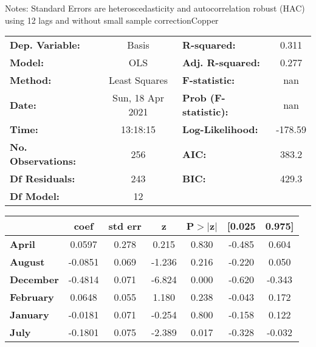 Notes: \newline
 [1] Standard Errors are heteroscedasticity and autocorrelation robust (HAC) using 12 lags and without small sample correctionCopper\begin{center}
\begin{tabular}{lclc}
\toprule
\textbf{Dep. Variable:}    &      Basis       & \textbf{  R-squared:         } &     0.311   \\
\textbf{Model:}            &       OLS        & \textbf{  Adj. R-squared:    } &     0.277   \\
\textbf{Method:}           &  Least Squares   & \textbf{  F-statistic:       } &       nan   \\
\textbf{Date:}             & Sun, 18 Apr 2021 & \textbf{  Prob (F-statistic):} &      nan    \\
\textbf{Time:}             &     13:18:15     & \textbf{  Log-Likelihood:    } &   -178.59   \\
\textbf{No. Observations:} &         256      & \textbf{  AIC:               } &     383.2   \\
\textbf{Df Residuals:}     &         243      & \textbf{  BIC:               } &     429.3   \\
\textbf{Df Model:}         &          12      & \textbf{                     } &             \\
\bottomrule
\end{tabular}
\begin{tabular}{lcccccc}
                   & \textbf{coef} & \textbf{std err} & \textbf{z} & \textbf{P$> |$z$|$} & \textbf{[0.025} & \textbf{0.975]}  \\
\midrule
\textbf{April}     &       0.0597  &        0.278     &     0.215  &         0.830        &       -0.485    &        0.604     \\
\textbf{August}    &      -0.0851  &        0.069     &    -1.236  &         0.216        &       -0.220    &        0.050     \\
\textbf{December}  &      -0.4814  &        0.071     &    -6.824  &         0.000        &       -0.620    &       -0.343     \\
\textbf{February}  &       0.0648  &        0.055     &     1.180  &         0.238        &       -0.043    &        0.172     \\
\textbf{January}   &      -0.0181  &        0.071     &    -0.254  &         0.800        &       -0.158    &        0.122     \\
\textbf{July}      &      -0.1801  &        0.075     &    -2.389  &         0.017        &       -0.328    &       -0.032     \\

\end{tabular}
\end{center}
